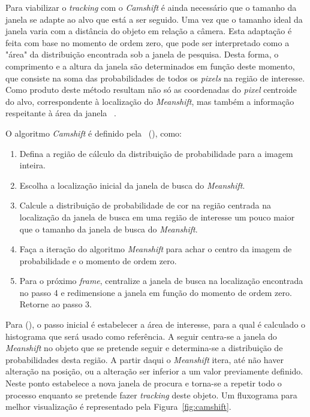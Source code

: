 Para viabilizar o \textit{tracking} com o \textit{Camshift} é ainda necessário que o tamanho da janela se adapte ao alvo que está a ser seguido. Uma vez que o tamanho ideal da janela varia com a distância do objeto em relação a câmera. Esta adaptação é feita com base no momento de ordem zero, que pode ser interpretado como a "área" da distribuição encontrada sob a janela de pesquisa. Desta forma, o comprimento e a altura da janela são determinados em função deste momento, que consiste na soma das probabilidades de todos os \textit{pixels} na região de interesse. Como produto deste método resultam não só as coordenadas do \textit{pixel} centroide do alvo, correspondente à localização do \textit{Meanshift}, mas também a informação respeitante à área da janela ~\cite{peixoto2012deteccao}.

O algoritmo \textit{Camshift} é definido pela~\citeauthor{intel2001corporation} (\citeyear{intel2001corporation}), como:

\begin{enumerate}
    \item Defina a região de cálculo da distribuição de probabilidade para a imagem inteira.
    \item Escolha a localização inicial da janela de busca do \textit{Meanshift}.
    \item Calcule a distribuição de probabilidade de cor na região centrada na localização da janela de busca em uma região de interesse um pouco maior que o tamanho da janela de busca do \textit{Meanshift}.
    \item Faça a iteração do algoritmo \textit{Meanshift} para achar o centro da imagem de probabilidade e o momento de ordem zero.
    \item Para o próximo \textit{frame}, centralize a janela de busca na localização encontrada no passo 4 e redimensione a janela em função do momento de ordem zero. Retorne ao passo 3.
\end{enumerate}

Para \citeauthor{peixoto2012deteccao} (\citeyear{peixoto2012deteccao}), o passo inicial é estabelecer a área de interesse, para a qual é calculado o histograma que será usado como referência. A seguir centra-se a janela do \textit{Meanshift} no objeto que se pretende seguir e determina-se a distribuição de probabilidades desta região. A partir daqui o \textit{Meanshift} itera, até não haver alteração na posição, ou a alteração ser inferior a um valor previamente definido. Neste ponto estabelece a nova janela de procura e torna-se a repetir todo o processo enquanto se pretende fazer \textit{tracking} deste objeto. Um fluxograma para melhor visualização é representado pela Figura~\ref{fig:camshift}.


